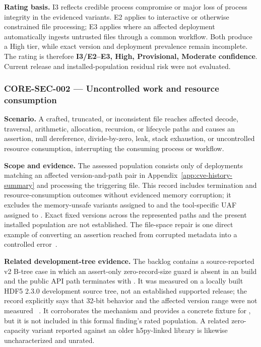 \documentclass[../main.tex]{subfiles}
\begin{document}
\noindent\textbf{Rating basis.}
I3 reflects credible process compromise or major loss of process integrity in
the evidenced variants. E2 applies to interactive or otherwise constrained
file processing; E3 applies where an affected deployment automatically ingests
untrusted files through a common workflow. Both produce a High tier, while
exact version and deployment prevalence remain incomplete. The rating is
therefore \textbf{I3/E2--E3, High, Provisional, Moderate confidence}. Current
release and installed-population residual risk were not evaluated.

\subsubsection*{CORE-SEC-002 --- Uncontrolled work and resource consumption}

\noindent\textbf{Scenario.}
A crafted, truncated, or inconsistent file reaches affected decode, traversal,
arithmetic, allocation, recursion, or lifecycle paths and causes an assertion,
null dereference, divide-by-zero, leak, stack exhaustion, or uncontrolled
resource consumption, interrupting the consuming process or workflow.

\noindent\textbf{Scope and evidence.}
The assessed population consists only of deployments matching an affected
version-and-path pair in Appendix~\ref{app:cve-history-summary} and processing
the triggering file. This record includes termination and resource-consumption
outcomes without evidenced memory corruption; it excludes the memory-unsafe
variants assigned to  and the tool-specific UAF assigned to
. Exact fixed versions across the represented paths and the
present installed population are not established. The file-space repair is one
direct example of converting an assertion reached from corrupted metadata into
a controlled error~\cite{commit_804f3ba,cve_hdf5}.

\noindent\textbf{Related development-tree evidence.}
The  backlog contains a source-reported v2 B-tree case in
which an assert-only zero-record-size guard is absent in an 
build and the public API path terminates with . It was measured on
a locally built HDF5 2.3.0 development source tree, not an established
supported release; the record explicitly says that 32-bit behavior and the
affected version range were not measured
~\cite{h5policy-case-v2btree-recordsize}. It corroborates the mechanism and
provides a concrete fixture for , but it is not included in this
formal finding's rated population. A related zero-capacity variant reported
against an older h5py-linked library is likewise uncharacterized and unrated.
\end{document}
